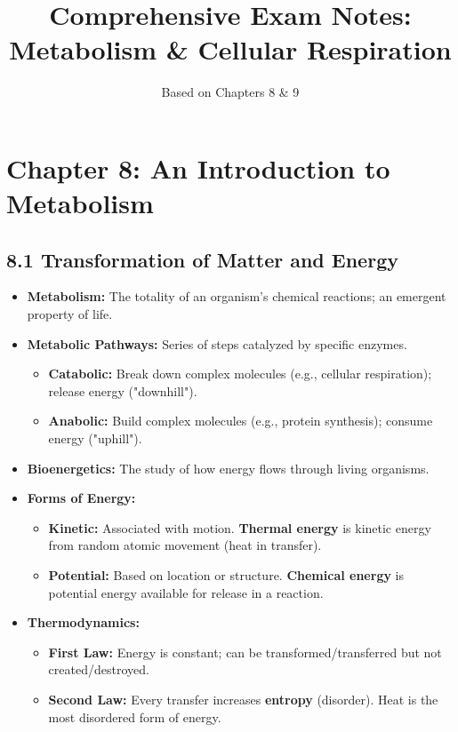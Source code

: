 \documentclass[11pt, a4paper]{article}
\title{Comprehensive Exam Notes: Metabolism \& Cellular Respiration}
\author{Based on Chapters 8 \& 9}
\date{}
\begin{document}
\maketitle

\section*{Chapter 8: An Introduction to Metabolism}

\subsection*{8.1 Transformation of Matter and Energy}
\begin{itemize}
    \item \textbf{Metabolism:} The totality of an organism's chemical reactions; an emergent property of life.
    \item \textbf{Metabolic Pathways:} Series of steps catalyzed by specific enzymes.
    \begin{itemize}
        \item \textbf{Catabolic:} Break down complex molecules (e.g., cellular respiration); release energy ("downhill").
        \item \textbf{Anabolic:} Build complex molecules (e.g., protein synthesis); consume energy ("uphill").
    \end{itemize}
    \item \textbf{Bioenergetics:} The study of how energy flows through living organisms.
    \item \textbf{Forms of Energy:}
    \begin{itemize}
        \item \textbf{Kinetic:} Associated with motion. \textbf{Thermal energy} is kinetic energy from random atomic movement (heat in transfer).
        \item \textbf{Potential:} Based on location or structure. \textbf{Chemical energy} is potential energy available for release in a reaction.
    \end{itemize}
    \item \textbf{Thermodynamics:} 
    \begin{itemize}
        \item \textbf{First Law:} Energy is constant; can be transformed/transferred but not created/destroyed.
        \item \textbf{Second Law:} Every transfer increases \textbf{entropy} (disorder). Heat is the most disordered form of energy.
    \end{itemize}
\end{itemize}
\end{document}
